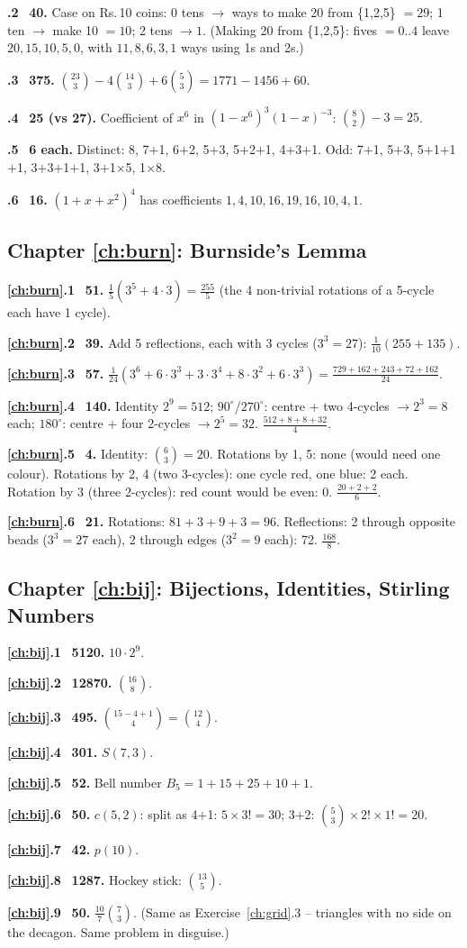 \documentclass[11pt,a4paper,openany]{report}
\newcommand{\C}[2]{\binom{#1}{#2}}
\newcommand{\Rs}{Rs.\,}
\newcommand{\solchapter}[2]{\subsection*{Chapter \ref*{#1}: #2}\def\solprefix{\ref*{#1}}}
\newcommand{\sol}[1]{\par\smallskip\textbf{\solprefix.#1}\ }
\begin{document}
\sol{2} \textbf{40.} Case on \Rs10 coins: 0 tens $\to$ ways to make 20 from \{1,2,5\} $=29$; 1 ten $\to$ make 10 $=10$; 2 tens $\to1$.
(Making 20 from \{1,2,5\}: fives $=0..4$ leave $20,15,10,5,0$, with $11,8,6,3,1$ ways using 1s and 2s.)

\sol{3} \textbf{375.} $\C{23}3-4\C{14}3+6\C53=1771-1456+60$.

\sol{4} \textbf{25 (vs 27).} Coefficient of $x^6$ in $(1-x^6)^3(1-x)^{-3}$: $\C82-3=25$.

\sol{5} \textbf{6 each.} Distinct: 8, 7$+$1, 6$+$2, 5$+$3, 5$+$2$+$1, 4$+$3$+$1. Odd: 7$+$1, 5$+$3, 5$+$1$+$1$+$1, 3$+$3$+$1$+$1, 3$+$1$\times$5, 1$\times$8.

\sol{6} \textbf{16.} $(1+x+x^2)^4$ has coefficients $1,4,10,16,19,16,10,4,1$.

\solchapter{ch:burn}{Burnside's Lemma}
\sol{1} \textbf{51.} $\frac15(3^5+4\cdot3)=\frac{255}5$ (the 4 non-trivial rotations of a 5-cycle each have 1 cycle).

\sol{2} \textbf{39.} Add 5 reflections, each with 3 cycles ($3^3=27$): $\frac1{10}(255+135)$.

\sol{3} \textbf{57.} $\frac1{24}(3^6+6\cdot3^3+3\cdot3^4+8\cdot3^2+6\cdot3^3)=\frac{729+162+243+72+162}{24}$.

\sol{4} \textbf{140.} Identity $2^9=512$; $90^\circ$/$270^\circ$: centre $+$ two 4-cycles $\to2^3=8$ each; $180^\circ$: centre $+$ four 2-cycles $\to2^5=32$. $\frac{512+8+8+32}4$.

\sol{5} \textbf{4.} Identity: $\C63=20$. Rotations by 1, 5: none (would need one colour). Rotations by 2, 4 (two 3-cycles): one cycle red, one blue: 2 each. Rotation by 3 (three 2-cycles): red count would be even: 0. $\frac{20+2+2}6$.

\sol{6} \textbf{21.} Rotations: $81+3+9+3=96$. Reflections: 2 through opposite beads ($3^3=27$ each), 2 through edges ($3^2=9$ each): 72. $\frac{168}8$.

\solchapter{ch:bij}{Bijections, Identities, Stirling Numbers}
\sol{1} \textbf{5120.} $10\cdot2^9$.
\sol{2} \textbf{12870.} $\C{16}8$.
\sol{3} \textbf{495.} $\C{15-4+1}4=\C{12}4$.
\sol{4} \textbf{301.} $S(7,3)$.
\sol{5} \textbf{52.} Bell number $B_5=1+15+25+10+1$.
\sol{6} \textbf{50.} $c(5,2)$: split as 4$+$1: $5\times3!=30$; 3$+$2: $\C53\times2!\times1!=20$.
\sol{7} \textbf{42.} $p(10)$.
\sol{8} \textbf{1287.} Hockey stick: $\C{13}5$.
\sol{9} \textbf{50.} $\frac{10}{7}\C73$. (Same as Exercise~\ref{ch:grid}.3 -- triangles with no side on the decagon. Same problem in disguise.)
\end{document}
